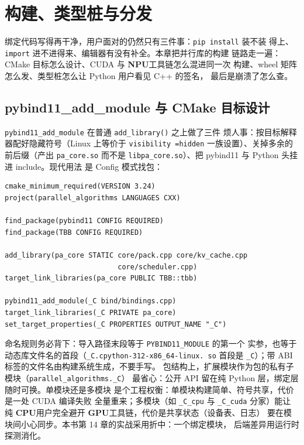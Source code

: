 \documentclass[12pt,a4paper,fontset=fandol]{ctexbook}
\newcommand{\Fn}[1]{\texttt{#1()}}
\newcommand{\Tp}[1]{\texttt{#1}}
\newcommand{\Dom}[1]{\textsf{\bfseries #1}}
\newcommand{\CPU}{\Dom{CPU}}
\newcommand{\GPU}{\Dom{GPU}}
\newcommand{\NPU}{\Dom{NPU}}
\begin{document}
\chapter{构建、类型桩与分发}

绑定代码写得再干净，用户面对的仍然只有三件事：\Tp{pip install} 装不装
得上、\Tp{import} 进不进得来、编辑器有没有补全。本章把并行库的构建
链路走一遍：CMake 目标怎么设计、CUDA 与 \NPU{}工具链怎么混进同一次
构建、wheel 矩阵怎么发、类型桩怎么让 Python 用户看见 C++ 的签名，
最后是崩溃了怎么查。

\section{pybind11\_add\_module 与 CMake 目标设计}

\Tp{pybind11\_add\_module} 在普通 \Fn{add\_library} 之上做了三件
烦人事：按目标解释器配好隐藏符号（Linux 上等价于 \Tp{visibility
=hidden} 一族设置）、关掉多余的前后缀（产出 \Tp{pa\_core.so} 而不是
\Tp{libpa\_core.so}）、把 pybind11 与 Python 头挂进 include。现代用法
是 Config 模式找包：

\begin{lstlisting}[style=cmakestyle,caption={模块与核函数分目标：绑定层薄、核函数可单测}]
cmake_minimum_required(VERSION 3.24)
project(parallel_algorithms LANGUAGES CXX)

find_package(pybind11 CONFIG REQUIRED)
find_package(TBB CONFIG REQUIRED)

add_library(pa_core STATIC core/pack.cpp core/kv_cache.cpp
                           core/scheduler.cpp)
target_link_libraries(pa_core PUBLIC TBB::tbb)

pybind11_add_module(_C bind/bindings.cpp)
target_link_libraries(_C PRIVATE pa_core)
set_target_properties(_C PROPERTIES OUTPUT_NAME "_C")
\end{lstlisting}

命名规则务必背下：导入路径末段等于 \Tp{PYBIND11\_MODULE} 的第一个
实参，也等于动态库文件名的首段（\Tp{\_C.cpython-312-x86\_64-linux.
so} 首段是 \Tp{\_C}）；带 ABI 标签的文件名由构建系统生成，不要手写。
包结构上，扩展模块作为包的私有子模块（\Tp{parallel\_algorithms.\_C}）
最省心：公开 API 留在纯 Python 层，绑定层随时可换。单模块还是多模块
是个工程权衡：单模块构建简单、符号共享，代价是一处 CUDA 编译失败
全量重来；多模块（如 \Tp{\_C\_cpu} 与 \Tp{\_C\_cuda} 分家）能让
纯 \CPU{}用户完全避开 \GPU{}工具链，代价是共享状态（设备表、日志）
要在模块间小心同步。本书第 14 章的实战采用折中：一个绑定模块，
后端差异用运行时探测消化。
\end{document}
